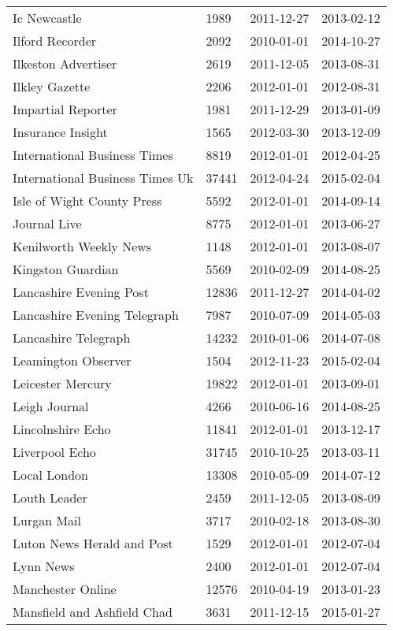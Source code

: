 \begin{longtable}{p{}p{}p{}p{}}
  Ic Newcastle & 1989 & 2011-12-27 & 2013-02-12 \\ 
  Ilford Recorder & 2092 & 2010-01-01 & 2014-10-27 \\ 
  Ilkeston Advertiser & 2619 & 2011-12-05 & 2013-08-31 \\ 
  Ilkley Gazette & 2206 & 2012-01-01 & 2012-08-31 \\ 
  Impartial Reporter & 1981 & 2011-12-29 & 2013-01-09 \\ 
  Insurance Insight & 1565 & 2012-03-30 & 2013-12-09 \\ 
  International Business Times & 8819 & 2012-01-01 & 2012-04-25 \\ 
  International Business Times Uk & 37441 & 2012-04-24 & 2015-02-04 \\ 
  Isle of Wight County Press & 5592 & 2012-01-01 & 2014-09-14 \\ 
  Journal Live & 8775 & 2012-01-01 & 2013-06-27 \\ 
  Kenilworth Weekly News & 1148 & 2012-01-01 & 2013-08-07 \\ 
  Kingston Guardian & 5569 & 2010-02-09 & 2014-08-25 \\ 
  Lancashire Evening Post & 12836 & 2011-12-27 & 2014-04-02 \\ 
  Lancashire Evening Telegraph & 7987 & 2010-07-09 & 2014-05-03 \\ 
  Lancashire Telegraph & 14232 & 2010-01-06 & 2014-07-08 \\ 
  Leamington Observer & 1504 & 2012-11-23 & 2015-02-04 \\ 
  Leicester Mercury & 19822 & 2012-01-01 & 2013-09-01 \\ 
  Leigh Journal & 4266 & 2010-06-16 & 2014-08-25 \\ 
  Lincolnshire Echo & 11841 & 2012-01-01 & 2013-12-17 \\ 
  Liverpool Echo & 31745 & 2010-10-25 & 2013-03-11 \\ 
  Local London & 13308 & 2010-05-09 & 2014-07-12 \\ 
  Louth Leader & 2459 & 2011-12-05 & 2013-08-09 \\ 
  Lurgan Mail & 3717 & 2010-02-18 & 2013-08-30 \\ 
  Luton News Herald and Post & 1529 & 2012-01-01 & 2012-07-04 \\ 
  Lynn News & 2400 & 2012-01-01 & 2012-07-04 \\ 
  Manchester Online & 12576 & 2010-04-19 & 2013-01-23 \\ 
  Mansfield and Ashfield Chad & 3631 & 2011-12-15 & 2015-01-27 \\ 

\end{longtable}
